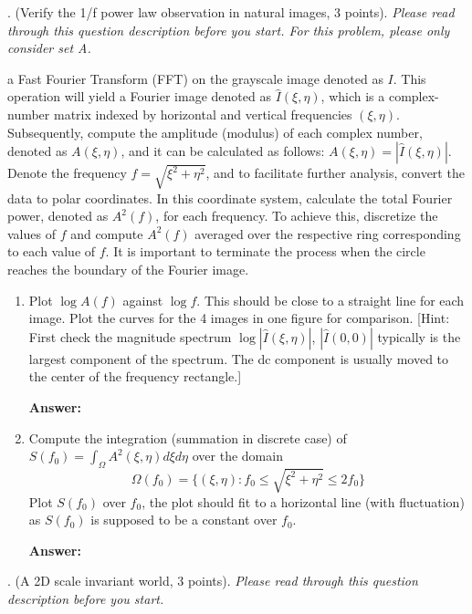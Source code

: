 \documentclass[11pt]{article}
\newcommand{\Answer}{\color{red}\textbf{Answer:} \color{black}}
\begin{document}
\clearpage

. (Verify the 1/f power law observation in natural images, 3 points). \emph{Please read through this question description before you start. For this problem, please only consider set A.}

 a Fast Fourier Transform (FFT) on the grayscale image denoted as $I$. This operation will yield a Fourier image denoted as $\hat I(\xi, \eta)$, which is a complex-number matrix indexed by horizontal and vertical frequencies $(\xi, \eta)$. Subsequently, compute the amplitude (modulus) of each complex number, denoted as $A(\xi, \eta)$, and it can be calculated as follows: $A(\xi, \eta) = |\hat I(\xi, \eta)|$. Denote the frequency $f=\sqrt{\xi^2 + \eta^2}$, and to facilitate further analysis, convert the data to polar coordinates. In this coordinate system, calculate the total Fourier power, denoted as $A^2(f)$, for each frequency. To achieve this, discretize the values of $f$ and compute $A^2(f)$ averaged over the respective ring corresponding to each value of $f$. It is important to terminate the process when the circle reaches the boundary of the Fourier image.

\begin{enumerate}

\item Plot $\log A(f)$ against $\log f$. This should be close to a straight line for each image. Plot the curves for the 4 images in one figure for comparison. [Hint: First check the magnitude spectrum $\log |\hat I(\xi, \eta)|$, $|\hat I(0, 0)|$ typically is the largest component of the spectrum. The dc component is usually moved to the center of the frequency rectangle.]

\Answer

\item Compute the integration (summation in discrete case) of $S(f_0) = \int_{\Omega} A^2(\xi, \eta) d\xi d\eta$ over the domain
 \[ \Omega(f_0) =\{(\xi, \eta): f_0 \leq \sqrt{\xi^2 + \eta^2} \leq 2f_0 \} \]
Plot $S(f_0)$ over $f_0$, the plot should fit to a horizontal line (with fluctuation) as $S(f_0)$ is supposed to be a constant over $f_0$.

\Answer

\end{enumerate}

\clearpage

. (A 2D scale invariant world, 3 points). \emph{Please read through this question description before you start.}
 
\end{document}

